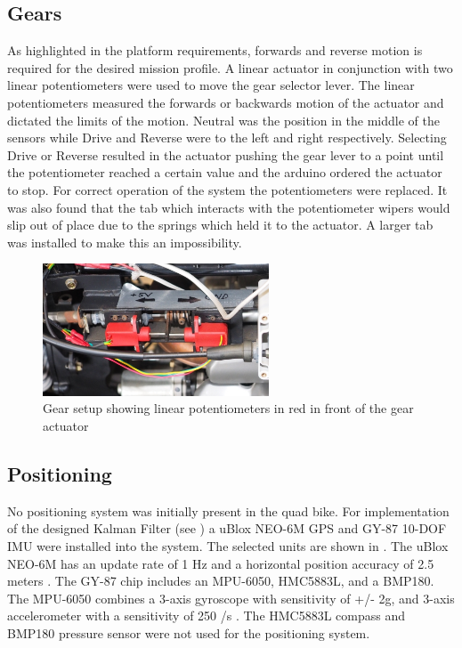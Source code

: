 \documentclass[main.tex]{subfiles}
\begin{document}
\subsection{Gears}
As highlighted in the platform requirements, forwards and reverse motion is required for the desired mission profile. A linear actuator in conjunction with two linear potentiometers were used to move the gear selector lever. The linear potentiometers measured the forwards or backwards motion of the actuator and dictated the limits of the motion. Neutral was the position in the middle of the sensors while Drive and Reverse were to the left and right respectively. Selecting Drive or Reverse resulted in the actuator pushing the gear lever to a point until the potentiometer reached a certain value and the arduino ordered the actuator to stop. For correct operation of the system the potentiometers were replaced. It was also found that the tab which interacts with the potentiometer wipers would slip out of place due to the springs which held it to the actuator. A larger tab was installed to make this an impossibility.
\begin{figure}[ht]
\includegraphics[width=0.6\textwidth]{4-DetailedDesign/gearSetup.JPG}
\centering
\caption[Gear system setup]{Gear setup showing linear potentiometers in red in front of the gear actuator} 
\end{figure}
\subsection{Positioning}
No positioning system was initially present in the quad bike. For implementation of the designed Kalman Filter (see ) a uBlox NEO-6M GPS and GY-87 10-DOF IMU were installed into the system. The selected units are shown in . The uBlox NEO-6M has an update rate of 1 Hz and a horizontal position accuracy of 2.5 meters \parencite{ublox2011}. The GY-87 chip includes an MPU-6050, HMC5883L, and a BMP180. The MPU-6050 combines a 3-axis gyroscope with sensitivity of +/- 2g, and 3-axis accelerometer with a sensitivity of 250 \degree/s \parencite{invensense2013}. The HMC5883L compass and BMP180 pressure sensor were not used for the positioning system.
\end{document}
